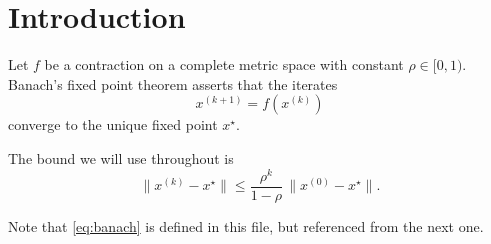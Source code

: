 \section{Introduction}\label{sec:intro}

Let $f$ be a contraction on a complete metric space with constant
$\rho \in [0, 1)$. Banach's fixed point theorem asserts that the iterates
\begin{equation}\label{eq:banach}
  x^{(k+1)} = f(x^{(k)})
\end{equation}
converge to the unique fixed point $x^\star$.

The bound we will use throughout is
\begin{equation}\label{eq:error}
  \lVert x^{(k)} - x^\star \rVert \leq
  \frac{\rho^{k}}{1 - \rho}\, \lVert x^{(0)} - x^\star \rVert .
\end{equation}

Note that \eqref{eq:banach} is defined in this file, but referenced from the
next one.